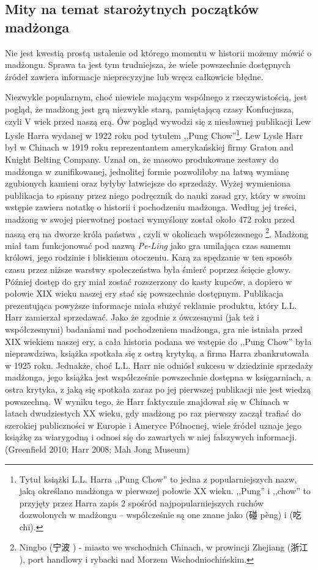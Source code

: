 \subsection{Mity na temat starożytnych początków madżonga}
Nie jest kwestią prostą ustalenie od którego momentu w historii możemy mówić o
madżongu. Sprawa ta jest tym trudniejsza, że wiele powszechnie dostępnych źródeł
zawiera informacje nieprecyzyjne lub wręcz całkowicie błędne. 

Niezwykle popularnym, choć niewiele mającym wspólnego z rzeczywistością, jest
pogląd, że madżong jest grą niezwykle starą, pamiętającą czasy Konfucjusza,
czyli V wiek przed naszą erą. Ów pogląd wywodzi się z niesławnej publikacji Lew
Lysle Harra wydanej w 1922 roku pod tytułem ,,Pung Chow''\footnote{Tytuł książki
L.L. Harra ,,Pung Chow'' to jedna z popularniejszych nazw, jaką określano
madżonga w pierwszej połowie XX wieku. ,,Pung'' i ,,chow'' to przyjęty przez
Harra zapis 2 spośród najpopularniejszych ruchów dozwolonych w madżongu --
współcześnie są one znane jako  (碰 pèng) i  (吃 chī).}.
Lew Lysle Harr był w Chinach w 1919 roku reprezentantem amerykańskiej firmy
Graton and Knight Belting Company. Uznał on, że masowo produkowane zestawy do
madżonga w zunifikowanej, jednolitej formie pozwoliłoby na łatwą wymianę
zgubionych kamieni oraz byłyby łatwiejsze do sprzedaży.
Wyżej wymieniona publikacja to spisany przez niego podręcznik do nauki zasad
gry, który w swoim wstępie zawiera notatkę o historii i pochodzeniu madżonga.
Według jej treści, madżong w swojej pierwotnej postaci wymyślony został około
472 roku przed naszą erą na dworze króla państwa , czyli w okolicach
współczesnego \footnote{Ningbo (宁波 ) - miasto we
wschodnich Chinach, w prowincji Zhejiang (浙江 ), port handlowy i
rybacki nad Morzem Wschodniochińskim.}. Madżong miał tam funkcjonować pod nazwą
\textit{Pe-Ling} jako gra umilająca czas samemu królowi, jego rodzinie i
bliskiemu otoczeniu. Karą za spędzanie w ten sposób czasu przez niższe warstwy
społeczeństwa była śmierć poprzez ścięcie głowy. Później dostęp do gry miał
zostać rozszerzony do kasty kupców, a dopiero w połowie XIX wieku naszej ery
stać się powszechnie dostępnym.
Publikacja prezentująca powyższe informacje miała służyć reklamie produktu,
który L.L. Harr zamierzał sprzedawać. Jako że zgodnie z ówczesnymi (jak
też i współczesnymi) badaniami nad pochodzeniem madżonga, gra nie istniała przed
XIX wiekiem naszej ery, a cała historia podana we wstępie do ,,Pung Chow'' była
nieprawdziwa, książka spotkała się z ostrą krytyką, a firma Harra zbankrutowała
w 1925 roku. Jednakże, choć L.L. Harr nie odniósł sukcesu w dziedzinie sprzedaży
madżonga, jego książka jest współcześnie powszechnie dostępna w księgarniach, a
ostra krytyka, z jaką się spotkała zaraz po jej pierwszej publikacji nie jest
wiedzą powszechną. W wyniku tego, że Harr faktycznie znajdował się w Chinach w
latach dwudziestych XX wieku, gdy madżong po raz pierwszy zaczął trafiać do
szerokiej publiczności w Europie i Ameryce Północnej, wiele źródeł uznaje jego
książkę za wiarygodną i odnosi się do zawartych w niej fałszywych informacji.
(Greenfield 2010; Harr 2008; Mah Jong Museum)

